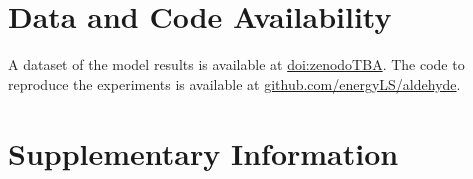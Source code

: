 \documentclass[5p]{elsarticle}
\begin{document}




\section*{Data and Code Availability}

A dataset of the model results is available at \href{zenodoTBA}{doi:zenodoTBA}.
The code to reproduce the experiments is available at \href{https://github.com/energyLS/aldehyde}{github.com/energyLS/aldehyde}.

\renewcommand{\ttdefault}{\sfdefault}



\newpage
\onecolumn

\makeatletter
\renewcommand \thesection{S\@arabic\c@section}
\renewcommand\thetable{S\@arabic\c@table}
\renewcommand \thefigure{S\@arabic\c@figure}
\makeatother
\renewcommand{\citenumfont}[1]{S#1}
\setcounter{equation}{0}
\setcounter{figure}{0}
\setcounter{table}{0}
\setcounter{section}{0}


\section*{Supplementary Information}
\label{sec:si}










%



\renewcommand{\ttdefault}{\sfdefault}
\end{document}
